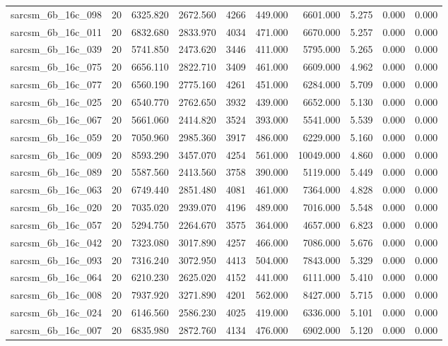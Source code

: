 \begin{tabular}{lrrrrrrrrr}
sarcsm\_6b\_16c\_098 & 20 & 6325.820 & 2672.560 & 4266 & 449.000 & 6601.000 & 5.275 & 0.000 & 0.000 \\
sarcsm\_6b\_16c\_011 & 20 & 6832.680 & 2833.970 & 4034 & 471.000 & 6670.000 & 5.257 & 0.000 & 0.000 \\
sarcsm\_6b\_16c\_039 & 20 & 5741.850 & 2473.620 & 3446 & 411.000 & 5795.000 & 5.265 & 0.000 & 0.000 \\
sarcsm\_6b\_16c\_075 & 20 & 6656.110 & 2822.710 & 3409 & 461.000 & 6609.000 & 4.962 & 0.000 & 0.000 \\
sarcsm\_6b\_16c\_077 & 20 & 6560.190 & 2775.160 & 4261 & 451.000 & 6284.000 & 5.709 & 0.000 & 0.000 \\
sarcsm\_6b\_16c\_025 & 20 & 6540.770 & 2762.650 & 3932 & 439.000 & 6652.000 & 5.130 & 0.000 & 0.000 \\
sarcsm\_6b\_16c\_067 & 20 & 5661.060 & 2414.820 & 3524 & 393.000 & 5541.000 & 5.539 & 0.000 & 0.000 \\
sarcsm\_6b\_16c\_059 & 20 & 7050.960 & 2985.360 & 3917 & 486.000 & 6229.000 & 5.160 & 0.000 & 0.000 \\
sarcsm\_6b\_16c\_009 & 20 & 8593.290 & 3457.070 & 4254 & 561.000 & 10049.000 & 4.860 & 0.000 & 0.000 \\
sarcsm\_6b\_16c\_089 & 20 & 5587.560 & 2413.560 & 3758 & 390.000 & 5119.000 & 5.449 & 0.000 & 0.000 \\
sarcsm\_6b\_16c\_063 & 20 & 6749.440 & 2851.480 & 4081 & 461.000 & 7364.000 & 4.828 & 0.000 & 0.000 \\
sarcsm\_6b\_16c\_020 & 20 & 7035.020 & 2939.070 & 4196 & 489.000 & 7016.000 & 5.548 & 0.000 & 0.000 \\
sarcsm\_6b\_16c\_057 & 20 & 5294.750 & 2264.670 & 3575 & 364.000 & 4657.000 & 6.823 & 0.000 & 0.000 \\
sarcsm\_6b\_16c\_042 & 20 & 7323.080 & 3017.890 & 4257 & 466.000 & 7086.000 & 5.676 & 0.000 & 0.000 \\
sarcsm\_6b\_16c\_093 & 20 & 7316.240 & 3072.950 & 4413 & 504.000 & 7843.000 & 5.329 & 0.000 & 0.000 \\
sarcsm\_6b\_16c\_064 & 20 & 6210.230 & 2625.020 & 4152 & 441.000 & 6111.000 & 5.410 & 0.000 & 0.000 \\
sarcsm\_6b\_16c\_008 & 20 & 7937.920 & 3271.890 & 4201 & 562.000 & 8427.000 & 5.715 & 0.000 & 0.000 \\
sarcsm\_6b\_16c\_024 & 20 & 6146.560 & 2586.230 & 4025 & 419.000 & 6336.000 & 5.101 & 0.000 & 0.000 \\
sarcsm\_6b\_16c\_007 & 20 & 6835.980 & 2872.760 & 4134 & 476.000 & 6902.000 & 5.120 & 0.000 & 0.000 \\

\end{tabular}
